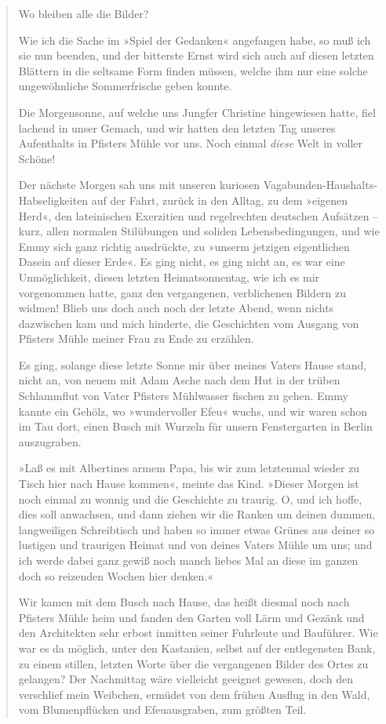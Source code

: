 \begin{verse}
Wo bleiben alle die Bilder?

Wie ich die Sache im »Spiel der Gedanken« angefangen habe, so muß
ich sie nun beenden, und der bitterste Ernst wird sich auch auf
diesen letzten Blättern in die seltsame Form finden müssen, welche
ihm nur eine solche ungewöhnliche Sommerfrische geben konnte.

Die Morgensonne, auf welche uns Jungfer Christine hingewiesen
hatte, fiel lachend in unser Gemach, und wir hatten den letzten Tag
unseres Aufenthalts in Pfisters Mühle vor uns. Noch einmal
\emph{diese} Welt in voller Schöne!

Der nächste Morgen sah uns mit unseren kuriosen
Vagabunden-Haushalts-Habseligkeiten auf der Fahrt, zurück in den
Alltag, zu dem »eigenen Herd«, den lateinischen Exerzitien und
regelrechten deutschen Aufsätzen – kurz, allen normalen Stilübungen
und soliden Lebensbedingungen, und wie Emmy sich ganz richtig
ausdrückte, zu »unserm jetzigen eigentlichen Dasein auf dieser
Erde«. Es ging nicht, es ging nicht an, es war eine Unmöglichkeit,
diesen letzten Heimatsonnentag, wie ich es mir vorgenommen hatte,
ganz den vergangenen, verblichenen Bildern zu widmen! Blieb uns
doch auch noch der letzte Abend, wenn nichts dazwischen kam und
mich hinderte, die Geschichten vom Ausgang von Pfisters Mühle
meiner Frau zu Ende zu erzählen.

Es ging, solange diese letzte Sonne mir über meines Vaters Hause
stand, nicht an, von neuem mit Adam Asche nach dem Hut in der
trüben Schlammflut von Vater Pfisters Mühlwasser fischen zu gehen.
Emmy kannte ein Gehölz, wo »wundervoller Efeu« wuchs, und wir waren
schon im Tau dort, einen Busch mit Wurzeln für unsern Fenstergarten
in Berlin auszugraben.

»Laß es mit Albertines armem Papa, bis wir zum letztenmal wieder zu
Tisch hier nach Hause kommen«, meinte das Kind. »Dieser Morgen ist
noch einmal zu wonnig und die Geschichte zu traurig. O, und ich
hoffe, dies soll anwachsen, und dann ziehen wir die Ranken um
deinen dummen, langweiligen Schreibtisch und haben so immer etwas
Grünes aus deiner so lustigen und traurigen Heimat und von deines
Vaters Mühle um uns; und ich werde dabei ganz gewiß noch manch
liebes Mal an diese im ganzen doch so reizenden Wochen hier
denken.«

Wir kamen mit dem Busch nach Hause, das heißt diesmal noch nach
Pfisters Mühle heim und fanden den Garten voll Lärm und Gezänk und
den Architekten sehr erbost inmitten seiner Fuhrleute und
Bauführer. Wie war es da möglich, unter den Kastanien, selbst auf
der entlegensten Bank, zu einem stillen, letzten Worte über die
vergangenen Bilder des Ortes zu gelangen? Der Nachmittag wäre
vielleicht geeignet gewesen, doch den verschlief mein Weibchen,
ermüdet von dem frühen Ausflug in den Wald, vom Blumenpflücken und
Efeuausgraben, zum größten Teil.


\end{verse}
